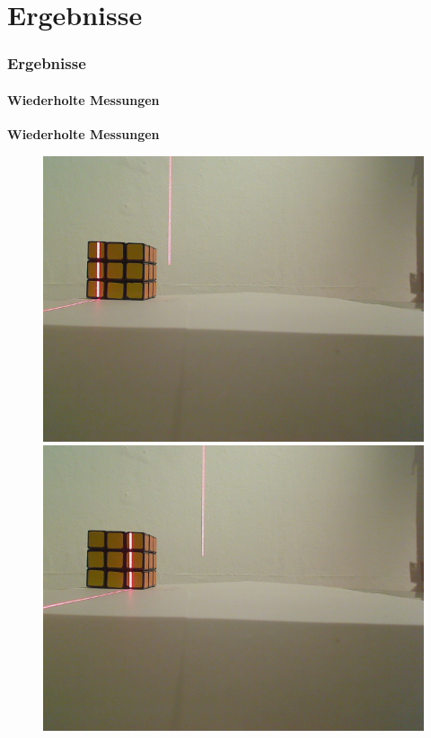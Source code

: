 \documentclass[xcolor=dvipsnames]{beamer}
\begin{document}
\section{Ergebnisse}
\begin{frame}
	\frametitle{Ergebnisse}
	\framesubtitle{Wiederholte Messungen}

	\textbf{Wiederholte Messungen}

	\begin{figure}
		\begin{minipage}{0.32\linewidth}
			\includegraphics[width=\linewidth]{includes/test_repeat_1}
		\end{minipage}
		\hfill
		\begin{minipage}{0.32\linewidth}
			\includegraphics[width=\linewidth]{includes/test_repeat_2}

\end{minipage}
\end{figure}
\end{frame}
\end{document}
